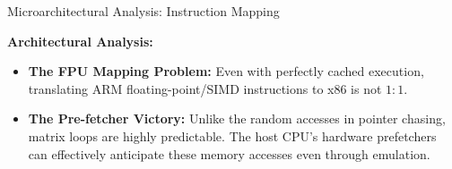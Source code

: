 \documentclass[aspectratio=169]{beamer} %
\begin{document}
  \begin{frame}{Microarchitectural Analysis: Instruction Mapping}
    \begin{table}[]
        \centering
        \renewcommand{\arraystretch}{1.3}
    \end{table}

    \vspace{0.3cm}
    \textbf{Architectural Analysis:}
    \begin{itemize}
        \item \textbf{The FPU Mapping Problem:} Even with perfectly cached execution, translating ARM floating-point/SIMD instructions to x86 is not $1:1$.
        \item \textbf{The Pre-fetcher Victory:} Unlike the random accesses in pointer chasing, matrix loops are highly predictable. The host CPU's hardware prefetchers can effectively anticipate these memory accesses even through emulation.
    \end{itemize}
  \end{frame}
\end{document}
